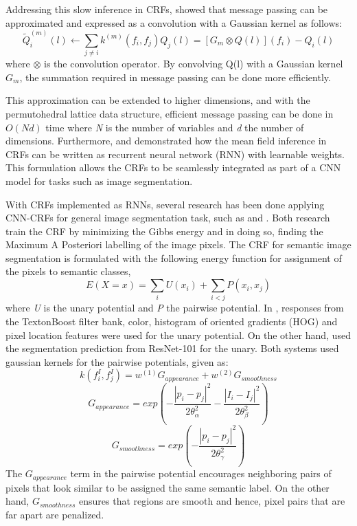 \documentclass[10pt, journal, compsoc]{IEEEtran}
\begin{document}
Addressing this slow inference in CRFs, \cite{NIPS2011_4296} showed that message passing can be approximated and expressed as a convolution with a Gaussian kernel as follows:
\begin{equation}
\widetilde{Q}_i^{(m)}(l)\gets \sum_{j\neq i}k^{(m)}(f_i,f_j)Q_j(l) = [G_m \otimes Q(l)](f_i) - Q_i(l)
\end{equation}
where $\otimes$ is the convolution operator. By convolving Q(l) with a Gaussian kernel $G_m$, the summation required in message passing can be done more efficiently.

This approximation can be extended to higher dimensions, and with the permutohedral lattice data structure, efficient message passing can be done in $O(Nd)$ time where \textit{N} is the number of variables and \textit{d} the number of dimensions. 
Furthermore, \cite{crfasrnn_ICCV2015} and \cite{higherordercrf_ECCV2016} demonstrated how the mean field inference in CRFs can be written as recurrent neural network (RNN) with learnable weights. This formulation allows the CRFs to be seamlessly integrated as part of a CNN model for tasks such as image segmentation.

With CRFs implemented as RNNs, several research has been done applying CNN-CRFs for general image segmentation task, such as  \cite{NIPS2011_4296} and \cite{Teichmann2018ConvolutionalCF}. Both research train the CRF by minimizing the Gibbs energy and in doing so, finding the Maximum A Posteriori labelling of the image pixels. The CRF for semantic image segmentation is formulated with the following energy function for assignment of the pixels to semantic classes,
\begin{equation}
E(X = x) = \sum_i U(x_i) + \sum_{i<j}P(x_i,x_j)
\end{equation}
where \textit{U} is the unary potential and \textit{P} the pairwise potential. In \cite{NIPS2011_4296}, responses from the TextonBoost filter bank, color, histogram of oriented gradients (HOG) and pixel location features were used for the unary potential. On the other hand, \cite{Teichmann2018ConvolutionalCF} used the segmentation prediction from ResNet-101 for the unary. Both systems used gaussian kernels for the pairwise potentials, given as:
\begin{equation}
k(f_i^I,f_j^I) = w^{(1)}G_{appearance} + w^{(2)}G_{smoothness}
\end{equation}
\begin{equation}
G_{appearance} = exp\left(-\frac{|p_i - p_j|^2}{2\theta_\alpha^2} - \frac{|I_i - I_j|^2}{2\theta_\beta^2}\right)
\end{equation}
\begin{equation}
G_{smoothness} = exp\left(-\frac{|p_i - p_j|^2}{2\theta_\gamma^2}\right)
\end{equation}
The $G_{appearance}$ term in the pairwise potential encourages neighboring pairs of pixels that look similar to be assigned the same semantic label. On the other hand, $G_{smoothness}$ ensures that regions are smooth and hence, pixel pairs that are far apart are penalized.
\end{document}
